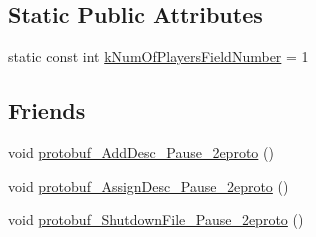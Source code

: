 \subsection*{Static Public Attributes}
\begin{DoxyCompactItemize}
\item 
static const int \hyperlink{class_pause_a3db8e5c058abd2047804f210d5f982ae}{k\-Num\-Of\-Players\-Field\-Number} = 1
\end{DoxyCompactItemize}
\subsection*{Friends}
\begin{DoxyCompactItemize}
\item 
void \hyperlink{class_pause_a6dd83dd31565ad93783f8d042924d6f3}{protobuf\-\_\-\-Add\-Desc\-\_\-\-Pause\-\_\-2eproto} ()
\item 
void \hyperlink{class_pause_a53e5c86813ef675cf1916aa78bc72131}{protobuf\-\_\-\-Assign\-Desc\-\_\-\-Pause\-\_\-2eproto} ()
\item 
void \hyperlink{class_pause_a5e08f905ac1c337aaf3fc36ffff15713}{protobuf\-\_\-\-Shutdown\-File\-\_\-\-Pause\-\_\-2eproto} ()
\end{DoxyCompactItemize}


